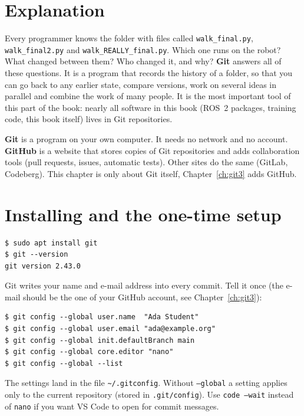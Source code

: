 \label{ch:git1}

\section*{Explanation}
Every programmer knows the folder with files called \texttt{walk\_final.py}, \texttt{walk\_final2.py} and \texttt{walk\_REALLY\_final.py}. Which one runs on the robot? What changed between them? Who changed it, and why? \textbf{Git} answers all of these questions. It is a program that records the history of a folder, so that you can go back to any earlier state, compare versions, work on several ideas in parallel and combine the work of many people. It is the most important tool of this part of the book: nearly all software in this book (ROS~2 packages, training code, this book itself) lives in Git repositories.

\begin{keyidea}
\textbf{Git} is a program on your own computer. It needs no network and no account. \textbf{GitHub} is a website that stores copies of Git repositories and adds collaboration tools (pull requests, issues, automatic tests). Other sites do the same (GitLab, Codeberg). This chapter is only about Git itself, Chapter~\ref{ch:git3} adds GitHub.
\end{keyidea}

\section*{Installing and the one-time setup}
\begin{verbatim}
$ sudo apt install git
$ git --version
git version 2.43.0
\end{verbatim}
Git writes your name and e-mail address into every commit. Tell it once (the e-mail should be the one of your GitHub account, see Chapter~\ref{ch:git3}):
\begin{verbatim}
$ git config --global user.name  "Ada Student"
$ git config --global user.email "ada@example.org"
$ git config --global init.defaultBranch main
$ git config --global core.editor "nano"
$ git config --global --list
\end{verbatim}
The settings land in the file \verb!~/.gitconfig!. Without \texttt{--global} a setting applies only to the current repository (stored in \verb!.git/config!). Use \texttt{code --wait} instead of \texttt{nano} if you want VS Code to open for commit messages.

